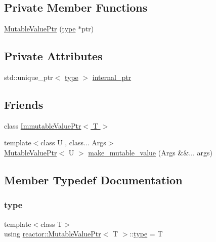 \subsection*{Private Member Functions}
\begin{DoxyCompactItemize}
\item 
\hyperlink{classreactor_1_1MutableValuePtr_a574ef3eecbb139aa2c814c394d753d4a}{Mutable\+Value\+Ptr} (\hyperlink{classreactor_1_1MutableValuePtr_a6dfaa60279549db876d8ea8b1135b46a}{type} $\ast$ptr)
\end{DoxyCompactItemize}
\subsection*{Private Attributes}
\begin{DoxyCompactItemize}
\item 
std\+::unique\+\_\+ptr$<$ \hyperlink{classreactor_1_1MutableValuePtr_a6dfaa60279549db876d8ea8b1135b46a}{type} $>$ \hyperlink{classreactor_1_1MutableValuePtr_aa141f1a246bb58b3047eb0d6ac54e2e9}{internal\+\_\+ptr}
\end{DoxyCompactItemize}
\subsection*{Friends}
\begin{DoxyCompactItemize}
\item 
class \hyperlink{classreactor_1_1MutableValuePtr_a4308f7dd79d565a0aa8bfb1375caa412}{Immutable\+Value\+Ptr$<$ T $>$}
\item 
{\footnotesize template$<$class U , class... Args$>$ }\\\hyperlink{classreactor_1_1MutableValuePtr}{Mutable\+Value\+Ptr}$<$ U $>$ \hyperlink{classreactor_1_1MutableValuePtr_ace4c49f73d7fc11f60f4979c5b1efbd2}{make\+\_\+mutable\+\_\+value} (Args \&\&... args)
\end{DoxyCompactItemize}


\subsection{Member Typedef Documentation}
\mbox{\label{classreactor_1_1MutableValuePtr_a6dfaa60279549db876d8ea8b1135b46a}} 
\subsubsection{\texorpdfstring{type}{type}}
{\footnotesize\ttfamily template$<$class T$>$ \\
using \hyperlink{classreactor_1_1MutableValuePtr}{reactor\+::\+Mutable\+Value\+Ptr}$<$ T $>$\+::\hyperlink{classreactor_1_1MutableValuePtr_a6dfaa60279549db876d8ea8b1135b46a}{type} =  T}



